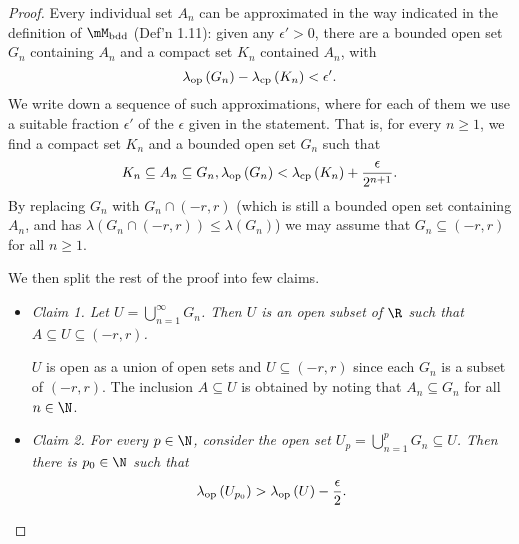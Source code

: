 \documentclass[pmath450]{subfiles}
\begin{document}
    \begin{proof}
        Every individual set $A_n$ can be approximated in the way indicated in the definition of $\mM_{\bdd}$ (Def'n 1.11): given any $\epsilon'>0$, there are a bounded open set $G_n$ containing $A_n$ and a compact set $K_n$ contained $A_n$, with
        \begin{equation*}
            \lambda_{\operatorname{op}}\left( G_n \right)-\lambda_{\operatorname{cp}}\left( K_n \right)<\epsilon'.
        \end{equation*}
        We write down a sequence of such approximations, where for each of them we use a suitable fraction $\epsilon'$ of the $\epsilon$ given in the statement. That is, for every $n\geq 1$, we find a compact set $K_n$ and a bounded open set $G_n$ such that
        \begin{equation}
            K_n\subseteq A_n\subseteq G_n, \lambda_{\operatorname{op}}\left( G_n \right)<\lambda_{\operatorname{cp}}\left( K_n \right)+\frac{\epsilon}{2^{n+1}}.
        \end{equation}
        By replacing $G_n$ with $G_n\cap\left( -r,r \right)$ (which is still a bounded open set containing $A_n$, and has $\lambda\left( G_n\cap\left( -r,r \right) \right)\leq\lambda\left( G_n \right)$) we may assume that $G_n\subseteq\left( -r,r \right)$ for all $n\geq 1$. 

        We then split the rest of the proof into few claims.
        \begin{itemize}
            \item \textit{Claim 1. Let $U=\bigcup^{\infty}_{n=1}G_n$. Then $U$ is an open subset of $\R$ such that $A\subseteq U\subseteq\left( -r,r \right)$.}

                \begin{subproof}
                    $U$ is open as a union of open sets and $U\subseteq\left( -r,r \right)$ since each $G_n$ is a subset of $\left( -r,r \right)$. The inclusion $A\subseteq U$ is obtained by noting that $A_n\subseteq G_n$ for all $n\in\N$.
                \end{subproof}

            \item \textit{Claim 2. For every $p\in\N$, consider the open set $U_p=\bigcup^{p}_{n=1}G_n\subseteq U$. Then there is $p_0\in\N$ such that
                    \begin{equation*}
                        \lambda_{\operatorname{op}}\left( U_{p_0} \right)>\lambda_{\operatorname{op}}\left( U \right)-\frac{\epsilon}{2}.
                    \end{equation*}
                }


\end{itemize}
\end{proof}
\end{document}

